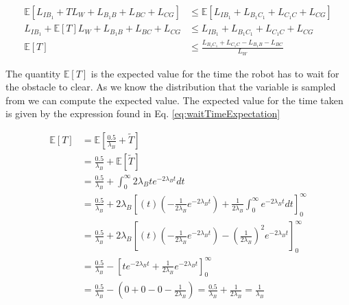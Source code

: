 \documentclass[a4paper,12pt]{article}
\begin{document}
			\begin{equation}
				\begin{split}
					\mathbb{E}\left[L_{IB_{1}} + TL_W + L_{B_{1}B} + L_{BC} + L_{CG}\right] & \leq \mathbb{E}\left[L_{IB_{1}} + L_{B_{1}C_{1}} + L_{C_{1}C} + L_{CG}\right] \\
					L_{IB_{1}} + \mathbb{E}\left[T\right] L_W + L_{B_{1}B} + L_{BC} + L_{CG} & \leq L_{IB_{1}} + L_{B_{1}C_{1}} + L_{C_{1}C} + L_{CG} \\
					\mathbb{E}\left[T\right] & \leq \frac{L_{B_{1}C_{1}} + L_{C_{1}C} - L_{B_{1}B} - L_{BC}}{L_W}
				\end{split}
				\label{eq:costExpectation1}
			\end{equation}

			The quantity $\mathbb{E}\left[T\right]$ is the expected value for the time the robot has to wait for the obstacle to clear. As we know the distribution that the variable is sampled from we can compute the expected value. The expected value for the time taken is given by the expression found in Eq. \ref{eq:waitTimeExpectation}

			\begin{equation}
				\begin{split}
					\mathbb{E}\left[T\right] & = \mathbb{E}\left[\frac{0.5}{\lambda_{B}}+\widetilde{T}\right] \\
					& = \frac{0.5}{\lambda_{B}} + \mathbb{E}\left[\widetilde{T}\right] \\
					& = \frac{0.5}{\lambda_{B}} + \int_{0}^{\infty}2\lambda_{B}te^{-2\lambda_{B}t} dt \\
					& = \frac{0.5}{\lambda_{B}} + 2\lambda_{B}\left[\left(t\right) \left(-\frac{1}{2\lambda_{B}}e^{-2\lambda_{B}t}\right) + \frac{1}{2\lambda_{B}} \int_{0}^{\infty}e^{-2\lambda_{B}t} dt \right]_{0}^{\infty} \\
					& = \frac{0.5}{\lambda_{B}} + 2\lambda_{B}\left[\left(t\right) \left(-\frac{1}{2\lambda_{B}}e^{-2\lambda_{B}t}\right) - \left(\frac{1}{2\lambda_{B}}\right)^2 e^{-2\lambda_{B}t} \right]_{0}^{\infty} \\
					& = \frac{0.5}{\lambda_{B}} - \left[te^{-2\lambda_{B}t} + \frac{1}{2\lambda_{B}} e^{-2\lambda_{B}t} \right]_{0}^{\infty} \\
					& = \frac{0.5}{\lambda_{B}} - (0 + 0 - 0 - \frac{1}{2\lambda_{B}}) = \frac{0.5}{\lambda_{B}} + \frac{1}{2\lambda_{B}} = \frac{1}{\lambda_{B}}
				\end{split}
				\label{eq:waitTimeExpectation}
			\end{equation}
\end{document}
